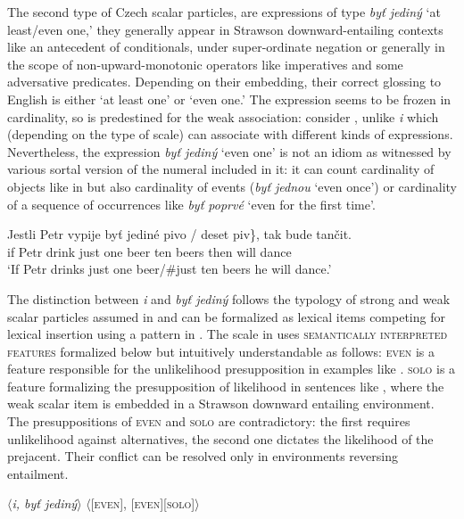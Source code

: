 \documentclass[output=paper,colorlinks,citecolor=brown]{langscibook}
\begin{document}
\noindent The second type of Czech scalar particles, are expressions of type \textit{byť jediný} `at least/even one,' they generally appear in Strawson downward-entailing contexts like an antecedent of conditionals, under super-ordinate negation or generally in the scope of non-upward-monotonic operators like imperatives and some adversative predicates. Depending on their embedding, their correct glossing to English is either `at least one' or `even one.' The expression seems to be frozen in cardinality, so is predestined for the weak association: consider , unlike \textit{i} which (depending on the type of scale) can associate with different kinds of expressions. Nevertheless, the expression \textit{byť jediný} `even one' is not an idiom as witnessed by various sortal version of the numeral included in it: it can count cardinality of objects like in  but also cardinality of events (\textit{byť jednou} `even once') or cardinality of a sequence of occurrences like \textit{byť poprvé} `even for the first time'.


\ea\label{ex:40} \gll Jestli Petr vypije byť \minsp{\{} jediné pivo / \minsp{\#} deset piv\}, tak bude tančit.\\
if Petr drink just {} one beer {} {} ten beers then will dance\\
\glt `If Petr drinks just one beer/\#just ten beers he will dance.'
\z

\noindent The distinction between \emph{i} and \emph{byť jediný} follows the typology of strong and weak scalar particles assumed in \citet{Crnic2011,gast2011scalar} and can be formalized as lexical items competing for lexical insertion using a pattern in . The scale in  uses \textsc{semantically interpreted features} formalized below but intuitively understandable as follows: \textsc{even} is a feature responsible for the unlikelihood presupposition in examples like . \textsc{solo} is a feature formalizing the presupposition of likelihood in sentences like , where the weak scalar item is embedded in a Strawson downward entailing environment. The presuppositions of \textsc{even} and \textsc{solo} are contradictory: the first requires unlikelihood against alternatives, the second one dictates the likelihood of the prejacent. Their conflict can be resolved only in environments reversing entailment.


\ea\label{ex:41} \ea $\langle$\textit{i, byť jediný}$\rangle$
\ex $\langle$\textsc{[even]}, \textsc{[even]}[\textsc{solo}]$\rangle$
\z
\z
\end{document}
